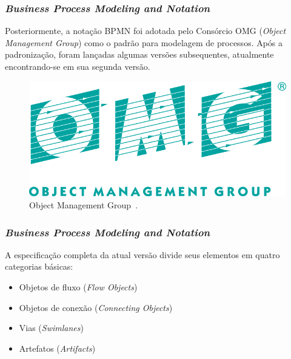 \documentclass[aspectratio=169]{beamer}
\begin{document}
\begin{frame}
\frametitle{\textit{Business Process Modeling and Notation}}
\justifying
Posteriormente, a notação BPMN foi adotada pelo Consórcio OMG (\textit{Object Management Group}) como o padrão para modelagem de processos. Após a padronização, foram lançadas algumas versões subsequentes, atualmente encontrando-se em sua segunda versão.

\begin{figure}
\centering
\includegraphics[scale=0.28]{images/logo.jpg}
\caption{Object Management Group~\cite{OMG}.}
\label{image:logo-omg}
\end{figure}

\end{frame}

\begin{frame}
\frametitle{\textit{Business Process Modeling and Notation}}
\justifying

A especificação completa da atual versão divide seus elementos em quatro categorias básicas:

\begin{itemize}
\item Objetos de fluxo (\textit{Flow Objects})
\item Objetos de conexão (\textit{Connecting Objects})
\item Vias (\textit{Swimlanes})
\item Artefatos (\textit{Artifacts})
\end{itemize}


\end{frame}
\end{document}
